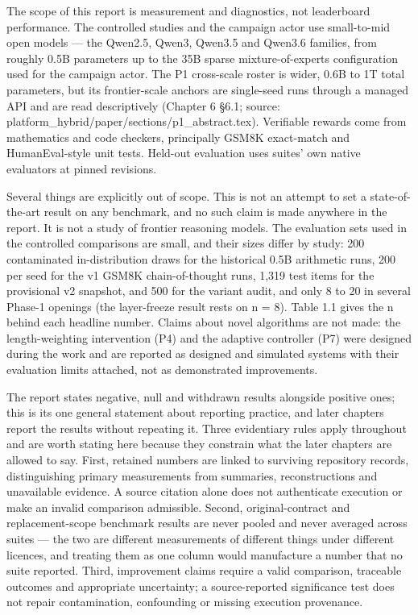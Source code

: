 \documentclass[12pt,a4paper]{report}
\begin{document}
The scope of this report is measurement and diagnostics, not leaderboard
performance. The controlled studies and the campaign actor use
small-to-mid open models --- the Qwen2.5, Qwen3, Qwen3.5 and Qwen3.6
families, from roughly 0.5B parameters up to the 35B sparse
mixture-of-experts configuration used for the campaign actor. The P1
cross-scale roster is wider, 0.6B to 1T total parameters, but its
frontier-scale anchors are single-seed runs through a managed API and
are read descriptively (Chapter 6 §6.1; source:
platform\_hybrid/paper/sections/p1\_abstract.tex). Verifiable rewards
come from mathematics and code checkers, principally GSM8K exact-match
and HumanEval-style unit tests. Held-out evaluation uses suites' own
native evaluators at pinned revisions.

Several things are explicitly out of scope. This is not an attempt to
set a state-of-the-art result on any benchmark, and no such claim is
made anywhere in the report. It is not a study of frontier reasoning
models. The evaluation sets used in the controlled comparisons are
small, and their sizes differ by study: 200 contaminated in-distribution
draws for the historical 0.5B arithmetic runs, 200 per seed for the v1
GSM8K chain-of-thought runs, 1,319 test items for the provisional v2
snapshot, and 500 for the variant audit, and only 8 to 20 in several
Phase-1 openings (the layer-freeze result rests on n = 8). Table 1.1
gives the n behind each headline number. Claims about novel algorithms
are not made: the length-weighting intervention (P4) and the adaptive
controller (P7) were designed during the work and are reported as
designed and simulated systems with their evaluation limits attached,
not as demonstrated improvements.

The report states negative, null and withdrawn results alongside
positive ones; this is its one general statement about reporting
practice, and later chapters report the results without repeating it.
Three evidentiary rules apply throughout and are worth stating here
because they constrain what the later chapters are allowed to say.
First, retained numbers are linked to surviving repository records,
distinguishing primary measurements from summaries, reconstructions and
unavailable evidence. A source citation alone does not authenticate
execution or make an invalid comparison admissible. Second,
original-contract and replacement-scope benchmark results are never
pooled and never averaged across suites --- the two are different
measurements of different things under different licences, and treating
them as one column would manufacture a number that no suite reported.
Third, improvement claims require a valid comparison, traceable outcomes
and appropriate uncertainty; a source-reported significance test does
not repair contamination, confounding or missing execution provenance.
\end{document}
